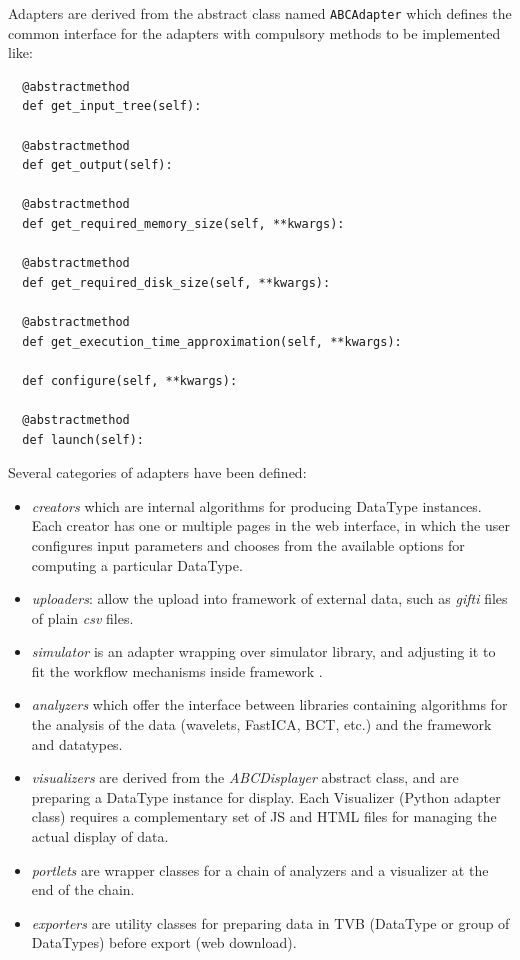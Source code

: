 Adapters are derived from the abstract class named \texttt{ABCAdapter} which
defines the common interface for the adapters with compulsory methods to be implemented like:

\begin{lstlisting}
  @abstractmethod
  def get_input_tree(self):

  @abstractmethod
  def get_output(self):

  @abstractmethod
  def get_required_memory_size(self, **kwargs):

  @abstractmethod
  def get_required_disk_size(self, **kwargs):

  @abstractmethod
  def get_execution_time_approximation(self, **kwargs):

  def configure(self, **kwargs):

  @abstractmethod
  def launch(self):
\end{lstlisting}

Several categories of adapters have been defined: 

\begin{itemize}
	\item \textit{creators} which are internal algorithms for producing DataType instances. 
		Each creator has one or multiple pages in the web interface, in which the user
		 configures input parameters and chooses from the available options for computing a particular DataType.

	\item \textit{uploaders}: allow the upload into \TVB framework of external data, 
    		such as \emph{gifti} files of plain \emph{csv} files.

	\item \textit{simulator} is an adapter wrapping over \TVB simulator library, and adjusting it to fit
		the workflow mechanisms inside \TVB framework .

	\item \textit{analyzers} which offer the interface between libraries containing algorithms 
		for the analysis of the data (wavelets, FastICA, BCT, etc.) and the \TVB framework and datatypes.

	\item \textit{visualizers} are derived from the \emph{ABCDisplayer} abstract class, and are preparing  
		a DataType instance for display. Each Visualizer (Python adapter class) requires a complementary set
		of JS and HTML files for managing the actual display of data.

	\item \textit{portlets} are wrapper classes for a chain of analyzers and a visualizer at the end of the chain.

	\item \textit{exporters} are utility classes for preparing data in TVB (DataType or group of DataTypes)
		before export (web download).
\end{itemize}

